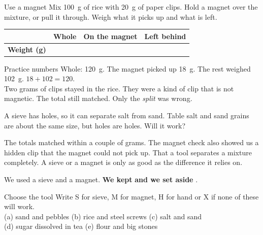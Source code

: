 \begin{tryit}{Use a magnet}
Mix 100~g of rice with 20~g of paper clips. Hold a magnet over the mixture, or pull it through. Weigh what it picks up and what is left.\par\medskip
\renewcommand{\arraystretch}{1.6}
\begin{tabular}{|l|c|c|c|}
\hline
 & \textbf{Whole} & \textbf{On the magnet} & \textbf{Left behind}\\ \hline
\textbf{Weight (g)} & & & \\ \hline
\end{tabular}
\end{tryit}

\begin{worked}{Practice numbers}
Whole: 120~g. The magnet picked up 18~g. The rest weighed 102~g. $18+102=120$.\\
Two grams of clips stayed in the rice. They were a kind of clip that is not magnetic. The total still matched. Only the \emph{split} was wrong.
\end{worked}

\begin{multix}[hmm]\multixbot[hmm]\tcblower
A sieve has holes, so it can separate salt from sand. Table salt and sand grains are about the same size, but holes are holes. Will it work?
\end{multix}

{The totals matched within a couple of grams. The magnet check also showed us a hidden clip that the magnet could not pick up.}
{That a tool separates a mixture completely. A sieve or a magnet is only as good as the difference it relies on.}

\begin{keepbox}
We used a sieve and a magnet. \textbf{We kept} \wline[3.4cm] \textbf{and we set aside} \wline[3.4cm].
\end{keepbox}

\clearpage

\begin{puzzle}{Choose the tool}
Write S for sieve, M for magnet, H for hand or X if none of these will work.\\
(a) sand and pebbles \wline[1cm] \quad (b) rice and steel screws \wline[1cm] \quad (c) salt and sand \wline[1cm]\\
(d) sugar dissolved in tea \wline[1cm] \quad (e) flour and big stones \wline[1cm]
\end{puzzle}

